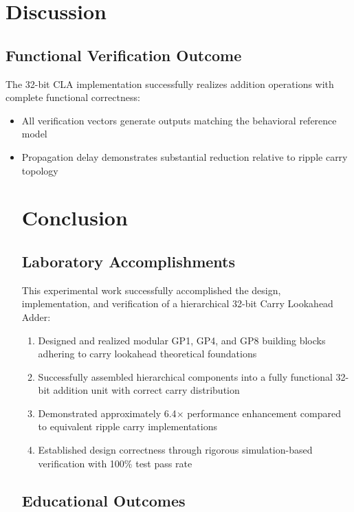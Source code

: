 \documentclass[a4paper, 11pt]{article}
\begin{document}
\section{Discussion}

\subsection{Functional Verification Outcome}

The 32-bit CLA implementation successfully realizes addition operations with complete functional correctness:

\begin{itemize}
    \item All verification vectors generate outputs matching the behavioral reference model
    \item Propagation delay demonstrates substantial reduction relative to ripple carry topology
\section{Conclusion}

\subsection{Laboratory Accomplishments}

This experimental work successfully accomplished the design, implementation, and verification of a hierarchical 32-bit Carry Lookahead Adder:

\begin{enumerate}
    \item Designed and realized modular GP1, GP4, and GP8 building blocks adhering to carry lookahead theoretical foundations
    \item Successfully assembled hierarchical components into a fully functional 32-bit addition unit with correct carry distribution
    \item Demonstrated approximately 6.4$\times$ performance enhancement compared to equivalent ripple carry implementations
    \item Established design correctness through rigorous simulation-based verification with 100\% test pass rate
\end{enumerate}

\subsection{Educational Outcomes}


\end{itemize}
\end{document}
